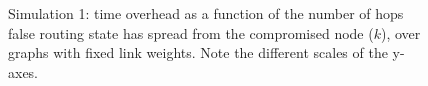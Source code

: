 \begin{figure}
\centering
{}
\caption{Simulation 1: time overhead as a function of the number of hops false routing state has spread from the compromised node ($k$), over \er graphs with fixed link weights. 
Note the different scales of the y-axes.}
\label{fig:epoch}
\end{figure} 


